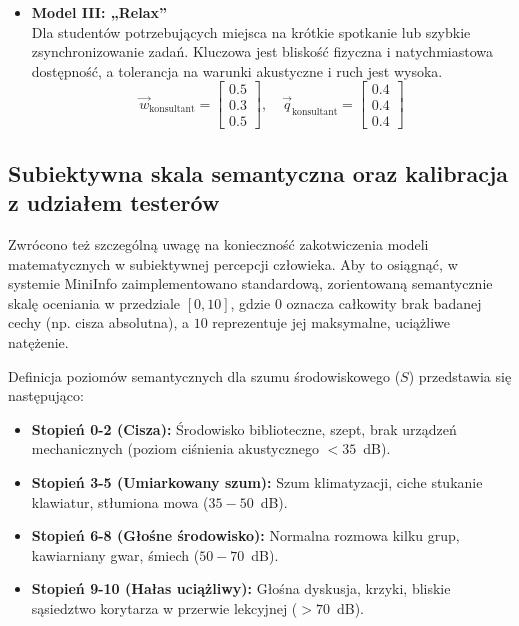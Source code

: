 \documentclass[14pt,a4paper]{extarticle}
\begin{document}
\begin{itemize}
    \item \textbf{Model III: „Relax”} \\
    Dla studentów potrzebujących miejsca na krótkie spotkanie lub szybkie zsynchronizowanie zadań. Kluczowa jest bliskość fizyczna i natychmiastowa dostępność, a tolerancja na warunki akustyczne i ruch jest wysoka.
    \begin{equation}
    \vec{w}_{\text{konsultant}} = \begin{bmatrix} 0.5 \\ 0.3 \\ 0.5 \end{bmatrix}, \quad \vec{q}_{\text{konsultant}} = \begin{bmatrix} 0.4 \\ 0.4 \\ 0.4 \end{bmatrix}
    \end{equation}
\end{itemize}

\subsection{Subiektywna skala semantyczna oraz kalibracja z udziałem testerów}
Zwrócono też szczególną uwagę na konieczność zakotwiczenia modeli matematycznych w subiektywnej percepcji człowieka. Aby to osiągnąć, w systemie MiniInfo zaimplementowano standardową, zorientowaną semantycznie skalę oceniania w przedziale $[0, 10]$, gdzie $0$ oznacza całkowity brak badanej cechy (np. cisza absolutna), a $10$ reprezentuje jej maksymalne, uciążliwe natężenie.

Definicja poziomów semantycznych dla szumu środowiskowego ($S$) przedstawia się następująco:
\begin{itemize}
    \item \textbf{Stopień 0-2 (Cisza):} Środowisko biblioteczne, szept, brak urządzeń mechanicznych (poziom ciśnienia akustycznego $< 35$~dB).
    \item \textbf{Stopień 3-5 (Umiarkowany szum):} Szum klimatyzacji, ciche stukanie klawiatur, stłumiona mowa ($35 - 50$~dB).
    \item \textbf{Stopień 6-8 (Głośne środowisko):} Normalna rozmowa kilku grup, kawiarniany gwar, śmiech ($50 - 70$~dB).
    \item \textbf{Stopień 9-10 (Hałas uciążliwy):} Głośna dyskusja, krzyki, bliskie sąsiedztwo korytarza w przerwie lekcyjnej ($> 70$~dB).
\end{itemize}
\end{document}
